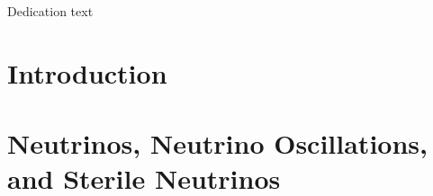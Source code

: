 \documentclass[11pt,openright,twoside,letterpaper,onecolumn]{report} %
\begin{document}
\linenumbers %

\pagestyle{empty}

\thesistitlepage
\thesiscopyrightpage

\thesisabstract


\pagestyle{plain}

\setlength{\footskip}{0.5in}

\setcounter{tocdepth}{2}
\renewcommand{\contentsname}{Table of Contents}
\tableofcontents
\cleardoublepage

\listoffigures
\cleardoublepage


\cleardoublepage

\thispagestyle{plain}
\strut \vfill
\centerline{\LARGE 
Dedication text
}
\vfill \strut
\cleardoublepage


\pagestyle{headings}

%
%
\setlength{\textheight}{8.5in}
\setlength{\footskip}{0in}




 {%
\fancyhf{}
\fancyhead[LE,RO]{\thepage}
\fancyhead[RE,LO]{\itshape \leftmark}
\renewcommand{\headrulewidth}{0pt}
}
\pagestyle{plain}

\chapter{Introduction}
\label{section:intro}
% 

\chapter{Neutrinos, Neutrino Oscillations, and Sterile Neutrinos}
\label{sec:theory}
% 
\end{document}
